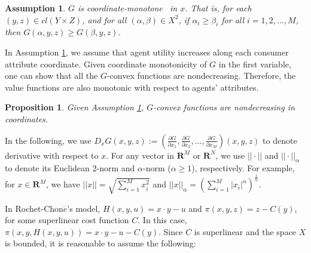 \documentclass[a4paper, 11pt]{amsart}
\numberwithin{equation}{section}
\theoremstyle{plain}
\newtheorem{proposition}[theorem]{Proposition}
\newtheorem{assumption}{Assumption}
\theoremstyle{definition}
\theoremstyle{remark}
\newcommand{\R}{\mathbf{R}}
\begin{document}



\begin{comment}
	{ is the so-called twist condition which is the similar/dual to but much less restrictive than the generalized single crossing condition proposed by McAfee-McMillan \cite{McAfeeMcMillan88}. Comparing to Figalli-Kim-McCann \cite{FigalliKimMcCann11}}\medskip
\end{comment}


\begin{assumption}\label{assmp:Gcoordinate-monotone}
	$G$ is coordinate-monotone
	~in $x$. That is, for each $(y,z)\in cl(Y\times Z)$, and for all $ (\alpha, \beta) \in X^2$, if $\alpha_i\ge \beta_i$ for all $ i=1,2,...,M$, then $G(\alpha,y,z)\ge G(\beta, y,z)$.
\end{assumption}


In Assumption \ref{assmp:Gcoordinate-monotone}, we assume that agent utility increases along each consumer attribute coordinate. Given coordinate monotonicity of $G$ in the first variable, one can show that all the $G$-convex functions are nondecreasing. Therefore, the value functions are also monotonic with respect to agents' attributes.\medskip

\begin{proposition}\label{nondecreasing}
	Given Assumption \ref{assmp:Gcoordinate-monotone}, $G$-convex functions are nondecreasing in coordinates.
\end{proposition}



 {In the following, we use  $D_x G(x,y,z) := (\frac{\partial G}{\partial x_1}, \frac{\partial G}{\partial x_2}, \dots, \frac{\partial G}{\partial x_M})(x,y,z)$ to denote derivative with respect to $x$. For any vector in $\R^M$ or $\R^N$, we use $||\cdot||$ and $||\cdot||_{\alpha}$ to denote its Euclidean  $2$-norm and $\alpha$-norm ($\alpha \ge 1$), respectively. For example, for $x\in \R^M$, we have $||x|| = \sqrt{\sum_{i=1}^{M} x_i^2}$ and $||x||_{\alpha} = (\sum_{i=1}^{M} |x_i|^{\alpha})^{\frac{1}{\alpha}}$.}\medskip
 
In Rochet-Chon$\acute{e}$'s model, $H(x,y,u) = x\cdot y -u$ and $\pi(x,y,z) = z-C(y)$, for some superlinear cost function $C$. In this case, $\pi(x,y,H(x,y,u)) = x\cdot y -u -C(y)$. Since $C$ is superlinear and the space $X$ is bounded, it is reasonable to assume the following:\medskip
\end{document}
